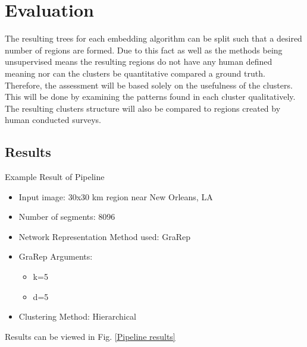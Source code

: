 \documentclass[journal,compsoc]{IEEEtran}
\begin{document}
\section{Evaluation}
The resulting trees for each embedding algorithm can be split such that a desired number of regions are formed. Due to this fact as well as the methods being unsupervised means the resulting regions do not have any human defined meaning nor can the clusters be quantitative compared a ground truth. Therefore, the assessment will be based solely on the usefulness of the clusters. This will be done by examining the patterns found in each cluster qualitatively. The resulting clusters structure will also be compared to regions created by human conducted surveys.

\subsection {Results}
Example Result of Pipeline
\begin{itemize}
	\item Input image: 30x30 km region near New Orleans, LA
	\item Number of segments: 8096
	\item Network Representation Method used: GraRep
	\item GraRep Arguments:
	\begin{itemize}
		\item k=5
		\item d=5
	\end{itemize}
	\item Clustering Method: Hierarchical
	
\end{itemize}
Results can be viewed in Fig. \ref{Pipeline results}
\end{document}
